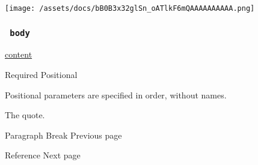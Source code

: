 \texttt{[image: /assets/docs/bB0B3x32glSn\_oATlkF6mQAAAAAAAAAA.png]}

\subsubsection{\texorpdfstring{\texttt{\ body\ }}{ body }}\label{parameters-body}

\href{/docs/reference/foundations/content/}{content}

{Required} {{ Positional }}

\label{parameters-body-positional-tooltip}
Positional parameters are specified in order, without names.

The quote.

\href{/docs/reference/model/parbreak/}{\pandocbounded{}}

{ Paragraph Break } { Previous page }

\href{/docs/reference/model/ref/}{\pandocbounded{}}

{ Reference } { Next page }
